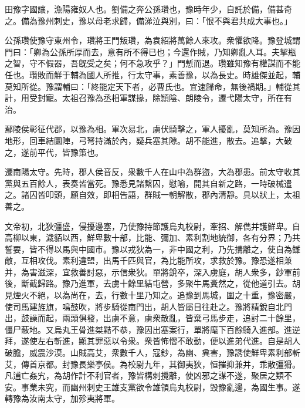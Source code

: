 \begin{pinyinscope}
 
 
 田豫字國讓，漁陽雍奴人也。劉備之奔公孫瓚也，豫時年少，自託於備，備甚奇之。備為豫州刺史，豫以母老求歸，備涕泣與別，曰：「恨不與君共成大事也。」
 
 
 
 
 公孫瓚使豫守東州令，瓚將王門叛瓚，為袁紹將萬餘人來攻。衆懼欲降。豫登城謂門曰：「卿為公孫所厚而去，意有所不得已也；今還作賊，乃知卿亂人耳。夫挈瓶之智，守不假器，吾旣受之矣；何不急攻乎？」門慙而退。瓚雖知豫有權謀而不能任也。瓚敗而鮮于輔為國人所推，行太守事，素善豫，以為長史。時雄傑並起，輔莫知所從。豫謂輔曰：「終能定天下者，必曹氏也。宜速歸命，無後禍期。」輔從其計，用受封寵。太祖召豫為丞相軍謀掾，除頴陰、朗陵令，遷弋陽太守，所在有治。
 
 
 
 
 鄢陵侯彰征代郡，以豫為相。軍次易北，虜伏騎擊之，軍人擾亂，莫知所為。豫因地形，回車結圜陣，弓弩持滿於內，疑兵塞其隙。胡不能進，散去。追擊，大破之，遂前平代，皆豫策也。
 
 
 
 
 遷南陽太守。先時，郡人侯音反，衆數千人在山中為群盜，大為郡患。前太守收其黨與五百餘人，表奏皆當死。豫悉見諸繫囚，慰喻，開其自新之路，一時破械遣之。諸囚皆叩頭，願自效，即相告語，群賊一朝解散，郡內清靜。具以狀上，太祖善之。
 
 
 
 
 文帝初，北狄彊盛，侵擾邊塞，乃使豫持節護烏丸校尉，牽招、解儁并護鮮卑。自高柳以東，濊貊以西，鮮卑數十部，比能、彌加、素利割地統御，各有分界；乃共誓要，皆不得以馬與中國市。豫以戎狄為一，非中國之利，乃先搆離之，使自為讎敵，互相攻伐。素利違盟，出馬千匹與官，為比能所攻，求救於豫。豫恐遂相兼并，為害滋深，宜救善討惡，示信衆狄。單將銳卒，深入虜庭，胡人衆多，鈔軍前後，斷截歸路。豫乃進軍，去虜十餘里結屯營，多聚牛馬糞然之，從他道引去。胡見煙火不絕，以為尚在，去，行數十里乃知之。追豫到馬城，圍之十重，豫密嚴，使司馬建旌旗，鳴鼓吹，將步騎從南門出，胡人皆屬目往赴之。豫將精銳自北門出，鼓譟而起，兩頭俱發，出虜不意，虜衆散亂，皆棄弓馬步走，追討二十餘里，僵尸蔽地。又烏丸王骨進桀黠不恭，豫因出塞案行，單將麾下百餘騎入進部。進逆拜，遂使左右斬進，顯其罪惡以令衆。衆皆怖慴不敢動，便以進弟代進。自是胡人破膽，威震沙漠。山賊高艾，衆數千人，寇鈔，為幽、兾害，豫誘使鮮卑素利部斬艾，傳首京都。封豫長樂亭侯。為校尉九年，其御夷狄，恒摧抑兼并，乖散彊猾。凡逋亡姦宄，為胡作計不利官者，豫皆構刺攪離，使凶邪之謀不遂，聚居之類不安。事業未究，而幽州刺史王雄支黨欲令雄領烏丸校尉，毀豫亂邊，為國生事。遂轉豫為汝南太守，加殄夷將軍。
 
 
 

\end{pinyinscope}
